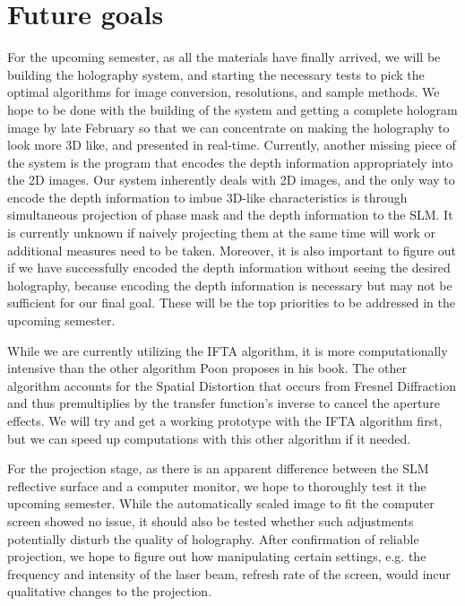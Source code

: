 \documentclass[12pt]{article}
\begin{document}
\section{Future goals}
For the upcoming semester, as all the materials have finally arrived, we will be building the holography system, and starting the necessary tests to pick the optimal algorithms for image conversion, resolutions, and sample methods. We hope to be done with the building of the system and getting a complete hologram image by late February so that we can concentrate on making the holography to look more 3D like, and presented in real-time. Currently, another missing piece of the system is the program that encodes the depth information appropriately into the 2D images. Our system inherently deals with 2D images, and the only way to encode the depth information to imbue 3D-like characteristics is through simultaneous projection of phase mask and the depth information to the SLM. It is currently unknown if naively projecting them at the same time will work or additional measures need to be taken. Moreover, it is also important to figure out if we have successfully encoded the depth information without seeing the desired holography, because encoding the depth information is necessary but may not be sufficient for our final goal. These will be the top priorities to be addressed in the upcoming semester.

While we are currently utilizing the IFTA algorithm, it is more computationally intensive than the other algorithm Poon proposes in his book. The other algorithm accounts for the Spatial Distortion that occurs from Fresnel Diffraction and thus premultiplies by the transfer function's inverse to cancel the aperture effects. We will try and get a working prototype with the IFTA algorithm first, but we can speed up computations with this other algorithm if it needed.

For the projection stage, as there is an apparent difference between the SLM reflective surface and a computer monitor, we hope to thoroughly test it the upcoming semester. While the automatically scaled image to fit the computer screen showed no issue, it should also be tested whether such adjustments potentially disturb the quality of holography. After confirmation of reliable projection, we hope to figure out how manipulating certain settings, e.g. the frequency and intensity of the laser beam, refresh rate of the screen, would incur qualitative changes to the projection.



\end{document}
